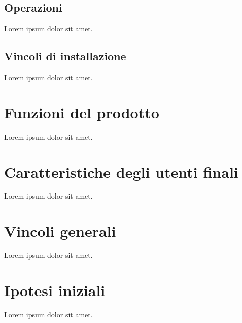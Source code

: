 \documentclass{scrreprt}
\begin{document}

	\subsection{Operazioni}
	Lorem ipsum dolor sit amet.


	\subsection{Vincoli di installazione}
	Lorem ipsum dolor sit amet.


\section{Funzioni del prodotto}
Lorem ipsum dolor sit amet.


\section{Caratteristiche degli utenti finali}
Lorem ipsum dolor sit amet.


\section{Vincoli generali}
Lorem ipsum dolor sit amet.


\section{Ipotesi iniziali}
Lorem ipsum dolor sit amet.
\end{document}

